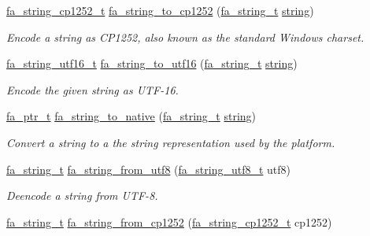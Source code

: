 \begin{DoxyCompactItemize}
\hyperlink{group___fa_string_ga8da3eea12a368d4c9d82c11c3dc6b9b6}{fa\-\_\-string\-\_\-cp1252\-\_\-t} \hyperlink{group___fa_string_ga098890a14da3285e373422d0c50f40fa}{fa\-\_\-string\-\_\-to\-\_\-cp1252} (\hyperlink{group___fa_string_gacada63033b77bc6c39fa632ae199349b}{fa\-\_\-string\-\_\-t} \hyperlink{util_8h_a41106000aac73b61e4fc2ef9dd39a603}{string})
\begin{DoxyCompactList}\small\item\em Encode a string as C\-P1252, also known as the standard Windows charset. \end{DoxyCompactList}\item 
\hyperlink{group___fa_string_ga8187bab75e77f0bbeeaf7ec2992cf7a9}{fa\-\_\-string\-\_\-utf16\-\_\-t} \hyperlink{group___fa_string_gab5d970c33bff37d051e1f8ad0c4ea3d2}{fa\-\_\-string\-\_\-to\-\_\-utf16} (\hyperlink{group___fa_string_gacada63033b77bc6c39fa632ae199349b}{fa\-\_\-string\-\_\-t} \hyperlink{util_8h_a41106000aac73b61e4fc2ef9dd39a603}{string})
\begin{DoxyCompactList}\small\item\em Encode the given string as U\-T\-F-\/16. \end{DoxyCompactList}\item 
\hyperlink{group___fa_ga915ddeae99ad7568b273d2b876425197}{fa\-\_\-ptr\-\_\-t} \hyperlink{group___fa_string_gaa07caea7289ff0d9cba693729ede3288}{fa\-\_\-string\-\_\-to\-\_\-native} (\hyperlink{group___fa_string_gacada63033b77bc6c39fa632ae199349b}{fa\-\_\-string\-\_\-t} \hyperlink{util_8h_a41106000aac73b61e4fc2ef9dd39a603}{string})
\begin{DoxyCompactList}\small\item\em Convert a string to a the string representation used by the platform. \end{DoxyCompactList}\item 
\hyperlink{group___fa_string_gacada63033b77bc6c39fa632ae199349b}{fa\-\_\-string\-\_\-t} \hyperlink{group___fa_string_gaecf2d7a3d99b683635cc5493033c09b7}{fa\-\_\-string\-\_\-from\-\_\-utf8} (\hyperlink{group___fa_string_ga3f817d24799e6924bc6a5186cd184fd8}{fa\-\_\-string\-\_\-utf8\-\_\-t} utf8)
\begin{DoxyCompactList}\small\item\em Deencode a string from U\-T\-F-\/8. \end{DoxyCompactList}\item 
\hyperlink{group___fa_string_gacada63033b77bc6c39fa632ae199349b}{fa\-\_\-string\-\_\-t} \hyperlink{group___fa_string_gacaf7053016f6fc6df5a4c7af5490525f}{fa\-\_\-string\-\_\-from\-\_\-cp1252} (\hyperlink{group___fa_string_ga8da3eea12a368d4c9d82c11c3dc6b9b6}{fa\-\_\-string\-\_\-cp1252\-\_\-t} cp1252)

\end{DoxyCompactItemize}
